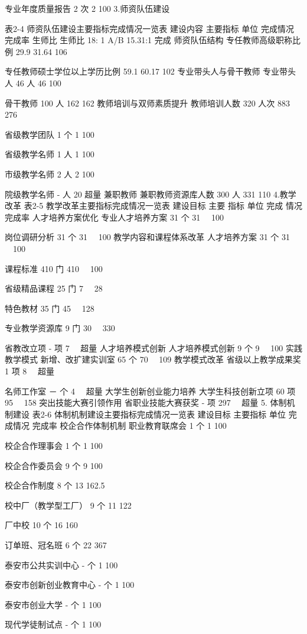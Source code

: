 专业年度质量报告
2
次
2
100%
3.师资队伍建设

表2-4  师资队伍建设主要指标完成情况一览表
建设内容
主要指标
单位
完成情况
完成率
生师比
生师比
18: 1
A/B
15.31:1
完成
师资队伍结构
专任教师高级职称比例
29.9
%
31.64
106%

专任教师硕士学位以上学历比例
59.1
%
60.17
102%
专业带头人与骨干教师
专业带头人
46
人
46
100%

骨干教师
100
人
162
162%
教师培训与双师素质提升
教师培训人数
320
人次
883
276%

省级教学团队
1
个
1
100%

省级教学名师
1
人
1
100%

市级教学名师
2
人
2
100%

院级教学名师
-
人
20
超量
兼职教师
兼职教师资源库人数
300
人
331
110%
4.教学改革
表2-5   教学改革主要指标完成情况一览表
建设目标
主要
指标
单位
完成
情况
完成率
人才培养方案优化
专业人才培养方案
31
个
31
　100%

岗位调研分析
31
个
31
　100%
教学内容和课程体系改革
人才培养方案
31
个
31
　100%

课程标准
410
门
410
　100%

省级精品课程
25
门
7
　28%

特色教材
35
门
45
　128%

专业教学资源库
9
门
30
　330%

省教改立项
-
项
7
　超量
人才培养模式创新
人才培养模式创新
9
个
9
　100%
实践教学模式
新增、改扩建实训室
65
个
70
　109%
教学模式改革
省级以上教学成果奖
1
项
8
　超量

名师工作室
－
个
4
　超量
大学生创新创业能力培养
大学生科技创新立项
60
项
95
　158%
突出技能大赛引领作用
省职业技能大赛获奖
-
项
297
　超量
5. 体制机制建设
表2-6  体制机制建设主要指标完成情况一览表
建设目标
主要指标
单位
完成情况
完成率
校企合作体制机制
职业教育联席会
1
个
1
100%

校企合作理事会
1
个
1
100%

校企合作委员会
9
个
9
100%

校企合作制度
8
个
13
162.5%

校中厂（教学型工厂）
9
个
11
122%

厂中校
10
个
16
160%

订单班、冠名班
6
个
22
367%

泰安市公共实训中心
-
个
1
100%

泰安市创新创业教育中心
-
个
1
100%

泰安市创业大学
-
个
1
100%

现代学徒制试点
-
个
1
100%

